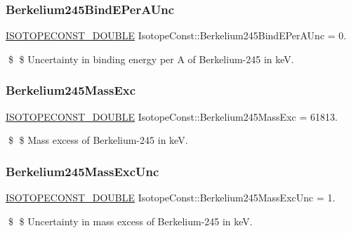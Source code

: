 \subsubsection{\texorpdfstring{Berkelium245\+Bind\+E\+Per\+A\+Unc}{Berkelium245BindEPerAUnc}}
{\footnotesize\ttfamily \mbox{\hyperlink{group___isotope_const-_macros_ga8f45a7272ce02c0b4c65c44636ed719a}{I\+S\+O\+T\+O\+P\+E\+C\+O\+N\+S\+T\+\_\+\+D\+O\+U\+B\+LE}} Isotope\+Const\+::\+Berkelium245\+Bind\+E\+Per\+A\+Unc = 0.}

\$ \$ Uncertainty in binding energy per A of Berkelium-\/245 in keV. \mbox{\label{group___isotope_const-_berkelium-_bk245_ga72fe45f14aa6372fffefff4abf3c512c}} 
\subsubsection{\texorpdfstring{Berkelium245\+Mass\+Exc}{Berkelium245MassExc}}
{\footnotesize\ttfamily \mbox{\hyperlink{group___isotope_const-_macros_ga8f45a7272ce02c0b4c65c44636ed719a}{I\+S\+O\+T\+O\+P\+E\+C\+O\+N\+S\+T\+\_\+\+D\+O\+U\+B\+LE}} Isotope\+Const\+::\+Berkelium245\+Mass\+Exc = 61813.}

\$ \$ Mass excess of Berkelium-\/245 in keV. \mbox{\label{group___isotope_const-_berkelium-_bk245_ga43c769850c53d99c501a2823a606f3b7}} 
\subsubsection{\texorpdfstring{Berkelium245\+Mass\+Exc\+Unc}{Berkelium245MassExcUnc}}
{\footnotesize\ttfamily \mbox{\hyperlink{group___isotope_const-_macros_ga8f45a7272ce02c0b4c65c44636ed719a}{I\+S\+O\+T\+O\+P\+E\+C\+O\+N\+S\+T\+\_\+\+D\+O\+U\+B\+LE}} Isotope\+Const\+::\+Berkelium245\+Mass\+Exc\+Unc = 1.}

\$ \$ Uncertainty in mass excess of Berkelium-\/245 in keV. \mbox{\label{group___isotope_const-_berkelium-_bk245_ga6d6f5c11b2074ae21960f455847486c9}} 
